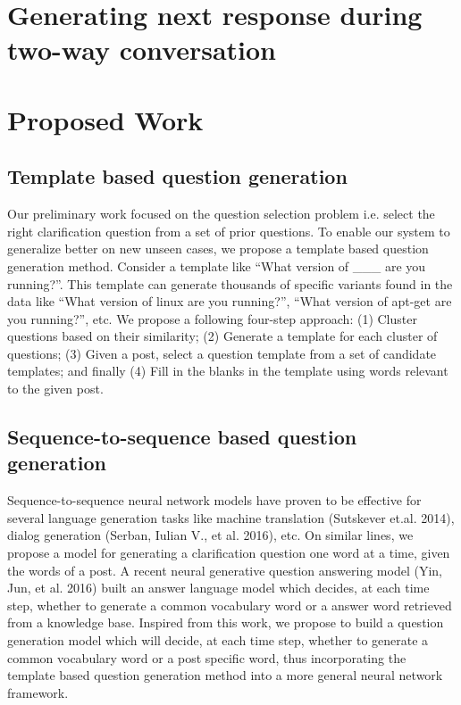 \documentclass[11pt]{report}
\numberwithin{equation}{section}
\begin{document}
\newpage

\chapter{Generating next response during two-way conversation}

\newpage

\chapter{Proposed Work}

\section{Template based question generation}

Our preliminary work focused on the question selection problem i.e. select the right clarification question from a set of prior questions. To enable our system to generalize better on new unseen cases, we propose a template based question generation method. Consider a template like ``What version of \_\_\_  are you running?''. This template can generate thousands of specific variants found in the data like ``What version of linux are you running?'',  ``What version of apt-get are you running?'', etc. We propose a following four-step approach:  (1) Cluster questions based on their similarity; (2) Generate a template for each cluster of questions; (3) Given a post, select a question template from a set of candidate templates; and finally (4) Fill in the blanks in the template using words relevant to the given post.

\section{Sequence-to-sequence based question generation}

Sequence-to-sequence neural network models have proven to be effective for several language generation tasks like machine translation (Sutskever et.al. 2014), dialog generation (Serban, Iulian V., et al. 2016), etc. On similar lines, we propose a model for generating a clarification question one word at a time, given the words of a post. A recent neural generative question answering model (Yin, Jun, et al.  2016) built an answer language model which decides, at each time step, whether to generate a common vocabulary word or a answer word retrieved from a knowledge base. Inspired from this work, we propose to build a question generation model which will decide, at each time step, whether to generate a common vocabulary word or a post specific word, thus incorporating the template based question generation method into a more general neural network framework.
\end{document}
